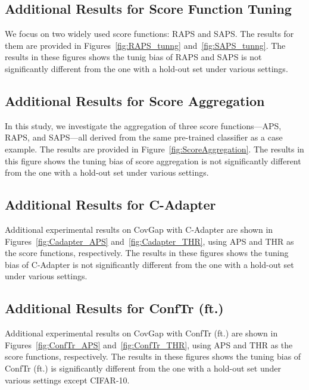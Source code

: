 \documentclass{article}
\newcommand{\1}{\mathbbm{1}}
\theoremstyle{plain}
\theoremstyle{definition}
\theoremstyle{remark}
\begin{document}
\subsection{Additional Results for Score Function Tuning}
We focus on two widely used score functions: RAPS and SAPS. The results for them are provided in Figures~\ref{fig:RAPS_tunng} and~\ref{fig:SAPS_tunng}. The results in these figures shows the tunig bias of RAPS and SAPS is not significantly different from the one with a hold-out set under various settings.


\subsection{Additional Results for Score Aggregation}  In this study, we investigate the aggregation of three score functions—APS, RAPS,
and SAPS—all derived from the same pre-trained classifier as a case example. The results are provided in Figure~\ref{fig:ScoreAggregation}. The results in this figure shows the tuning bias of score aggregation is not significantly different from the one with a hold-out set under various settings.

\subsection{Additional Results for C-Adapter}
Additional experimental results on CovGap with C-Adapter are shown in Figures~\ref{fig:Cadapter_APS} and~\ref{fig:Cadapter_THR}, using APS and THR as the score functions, respectively. The results in these figures shows the tuning bias of C-Adapter is not significantly different from the one with a hold-out set under various settings.
\subsection{Additional Results for ConfTr (ft.)}
Additional experimental results on CovGap with ConfTr (ft.) are shown in Figures~\ref{fig:ConfTr_APS} and~\ref{fig:ConfTr_THR}, using APS and THR as the score functions, respectively. The results in these figures shows the tuning bias of ConfTr (ft.) is significantly different from the one with a hold-out set under various settings except CIFAR-10.
\end{document}
